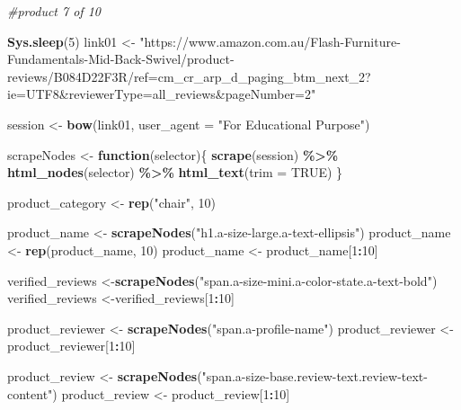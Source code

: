 \documentclass[
]{article}
\newenvironment{Shaded}{\begin{snugshade}}{\end{snugshade}}
\newcommand{\AttributeTok}[1]{\textcolor[rgb]{0.13,0.29,0.53}{#1}}
\newcommand{\CommentTok}[1]{\textcolor[rgb]{0.56,0.35,0.01}{\textit{#1}}}
\newcommand{\ConstantTok}[1]{\textcolor[rgb]{0.56,0.35,0.01}{#1}}
\newcommand{\ControlFlowTok}[1]{\textcolor[rgb]{0.13,0.29,0.53}{\textbf{#1}}}
\newcommand{\DecValTok}[1]{\textcolor[rgb]{0.00,0.00,0.81}{#1}}
\newcommand{\FunctionTok}[1]{\textcolor[rgb]{0.13,0.29,0.53}{\textbf{#1}}}
\newcommand{\NormalTok}[1]{#1}
\newcommand{\OtherTok}[1]{\textcolor[rgb]{0.56,0.35,0.01}{#1}}
\newcommand{\SpecialCharTok}[1]{\textcolor[rgb]{0.81,0.36,0.00}{\textbf{#1}}}
\newcommand{\StringTok}[1]{\textcolor[rgb]{0.31,0.60,0.02}{#1}}
\begin{document}
\begin{Shaded}
\begin{Highlighting}[]
\CommentTok{\#product 7 of 10}
  
\FunctionTok{Sys.sleep}\NormalTok{(}\DecValTok{5}\NormalTok{)}
\NormalTok{link01 }\OtherTok{\textless{}{-}} \StringTok{"https://www.amazon.com.au/Flash{-}Furniture{-}Fundamentals{-}Mid{-}Back{-}Swivel/product{-}reviews/B084D22F3R/ref=cm\_cr\_arp\_d\_paging\_btm\_next\_2?ie=UTF8\&reviewerType=all\_reviews\&pageNumber=2"}


\NormalTok{  session }\OtherTok{\textless{}{-}} \FunctionTok{bow}\NormalTok{(link01,}
               \AttributeTok{user\_agent =} \StringTok{"For Educational Purpose"}\NormalTok{)}

\NormalTok{  scrapeNodes }\OtherTok{\textless{}{-}} \ControlFlowTok{function}\NormalTok{(selector)\{}
    \FunctionTok{scrape}\NormalTok{(session) }\SpecialCharTok{\%\textgreater{}\%}
      \FunctionTok{html\_nodes}\NormalTok{(selector) }\SpecialCharTok{\%\textgreater{}\%}
      \FunctionTok{html\_text}\NormalTok{(}\AttributeTok{trim =} \ConstantTok{TRUE}\NormalTok{)}
\NormalTok{  \}}

\NormalTok{  product\_category }\OtherTok{\textless{}{-}} \FunctionTok{rep}\NormalTok{(}\StringTok{"chair"}\NormalTok{, }\DecValTok{10}\NormalTok{)}

\NormalTok{  product\_name }\OtherTok{\textless{}{-}} \FunctionTok{scrapeNodes}\NormalTok{(}\StringTok{"h1.a{-}size{-}large.a{-}text{-}ellipsis"}\NormalTok{)}
\NormalTok{  product\_name }\OtherTok{\textless{}{-}} \FunctionTok{rep}\NormalTok{(product\_name, }\DecValTok{10}\NormalTok{)}
\NormalTok{  product\_name }\OtherTok{\textless{}{-}}\NormalTok{ product\_name[}\DecValTok{1}\SpecialCharTok{:}\DecValTok{10}\NormalTok{]}
  
\NormalTok{  verified\_reviews }\OtherTok{\textless{}{-}}\FunctionTok{scrapeNodes}\NormalTok{(}\StringTok{"span.a{-}size{-}mini.a{-}color{-}state.a{-}text{-}bold"}\NormalTok{)}
\NormalTok{  verified\_reviews }\OtherTok{\textless{}{-}}\NormalTok{verified\_reviews[}\DecValTok{1}\SpecialCharTok{:}\DecValTok{10}\NormalTok{]}
  
\NormalTok{  product\_reviewer }\OtherTok{\textless{}{-}} \FunctionTok{scrapeNodes}\NormalTok{(}\StringTok{"span.a{-}profile{-}name"}\NormalTok{)}
\NormalTok{  product\_reviewer }\OtherTok{\textless{}{-}}\NormalTok{ product\_reviewer[}\DecValTok{1}\SpecialCharTok{:}\DecValTok{10}\NormalTok{]}
  
\NormalTok{  product\_review }\OtherTok{\textless{}{-}} \FunctionTok{scrapeNodes}\NormalTok{(}\StringTok{"span.a{-}size{-}base.review{-}text.review{-}text{-}content"}\NormalTok{)}
\NormalTok{  product\_review }\OtherTok{\textless{}{-}}\NormalTok{ product\_review[}\DecValTok{1}\SpecialCharTok{:}\DecValTok{10}\NormalTok{]}
  

\end{Highlighting}
\end{Shaded}
\end{document}
